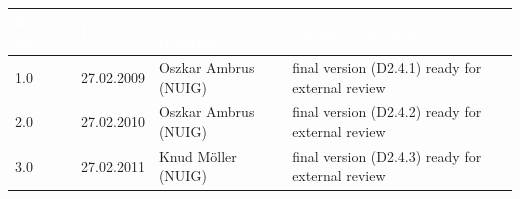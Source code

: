 \documentclass{fast_latex}
\newcommand\authorOne{Oszkar Ambrus (NUIG)}
\newcommand\authorTwo{Knud M\"{o}ller (NUIG)}
\begin{document}
\begin{small}
\begin{tabular}{|l|l|l|p{7.5cm}|}
\hline
\rowcolor{fast@lightgrey}\textcolor{white}{\textbf{Rev. No.}} &
                            \textcolor{white}{\textbf{Date}} &
                            \textcolor{white}{\textbf{Author (Partner)}} &
                            \textcolor{white}{\textbf{Change description}}\\ \hline
1.0 & 27.02.2009 & \authorOne & final version (D2.4.1) ready for external review \\ \hline
2.0 & 27.02.2010 & \authorOne & final version (D2.4.2) ready for external review \\ \hline
3.0 & 27.02.2011 & \authorTwo & final version (D2.4.3) ready for external review \\ \hline
\end{tabular}
\end{small}

\color{black}

\vfill
\end{document}
